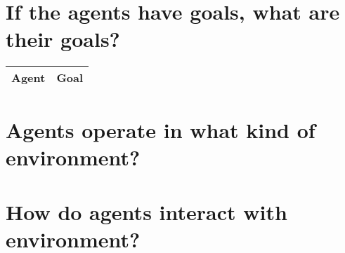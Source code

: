 \documentclass[]{article}
\begin{document}
\section{If the agents have goals, what are their goals?}

\begin{tabular}{|l|l|} \hline
	Agent&Goal\\ \hline

\end{tabular}


\section{Agents operate in what kind of environment?}
\section{How do agents interact with environment?}

\medskip



\end{document}
